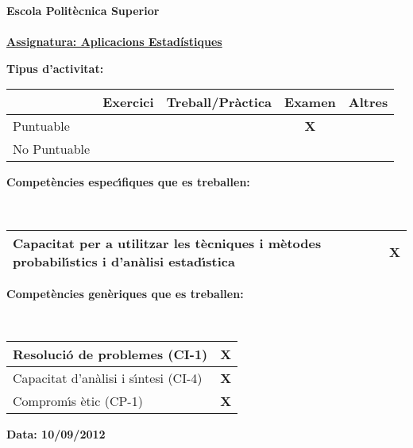 \documentclass[a4paper,12pt]{article}
\begin{document}
\noindent\textbf{\large{Escola Polit\`ecnica Superior}}\\
\\

\noindent\textbf{\underline{\large{Assignatura: Aplicacions Estad\'{i}stiques}\hspace{10cm}} }\\ 
\noindent\begin{small}\textbf{Tipus d'activitat:}\end{small}
\begin{center}
\begin{tabular}{|l|c|c|c|c|}\hline
 		&Exercici & Treball/Pr\`actica & Examen & Altres \\ \hline
Puntuable       & 	  & 			 & \textbf{X}  	  & \\ \hline
No Puntuable    &  	  &			 & 	  & \\ \hline
\end{tabular}
\end{center}
\noindent\begin{small}\textbf{Compet\`encies espec\'{\i}fiques que es treballen:}\end{small}\\
\begin{tabular}{|l|c|}\hline
Capacitat per a utilitzar les t\`ecniques i m\`etodes probabil\'{\i}stics i d'an\`alisi estad\'{\i}stica & \textbf{X} \\ \hline
\end{tabular}\vspace{0.25cm}

\noindent\begin{small}\textbf{Compet\`encies gen\`eriques que es treballen:}\end{small}\\
\begin{tabular}{|l|c|}\hline
Resoluci\'o de problemes (CI-1) & \textbf{X}\\ \hline
Capacitat d'an\`alisi i s\'{\i}ntesi (CI-4) & \textbf{X}  \\ \hline
Comprom\'{\i}s \`etic (CP-1)$\quad$ & \textbf{X} \\ \hline
\end{tabular}\vspace{0.25cm}

\noindent\begin{small}\textbf{Data: 10/09/2012 }\end{small}\\
\noindent\underline{\hspace{18cm}}
\end{document}
